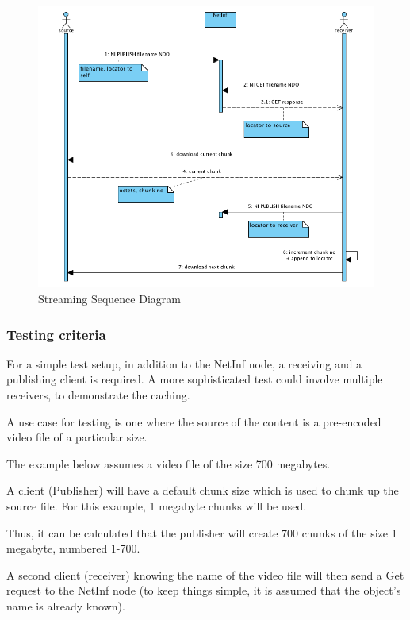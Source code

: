 \begin{figure}
\centering
\includegraphics[scale=0.5]{./img/sequence_diagram_streaming.png}
\caption{Streaming Sequence Diagram}\label{fig:streaming_dia}
\end{figure}


\subsubsection{Testing criteria} 

For a simple test setup, in addition to the NetInf node, a receiving and a publishing client is required. A more sophisticated test could involve multiple receivers, to demonstrate the caching.

A use case for testing is one where the source of the content is a pre-encoded video file of a particular size.

The example below assumes a video file of the size 700 megabytes.

A client (Publisher) will have a default chunk size which is used to chunk up the source file. For this example, 1 megabyte chunks will be used.

Thus, it can be calculated that the publisher will create 700 chunks of the size 1 megabyte, numbered 1-700.

A second client (receiver) knowing the name of the video file will then send a Get request to the NetInf node (to keep things simple, it is assumed that the object's name is already known).

